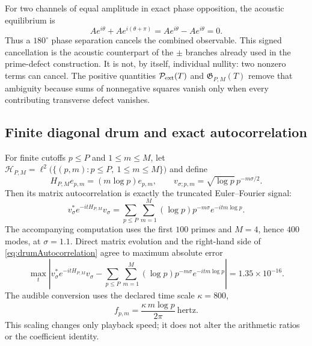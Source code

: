 \documentclass[11pt]{amsart}
\theoremstyle{definition}
\theoremstyle{remark}
\begin{document}
For two channels of equal amplitude in exact phase opposition, the acoustic equilibrium is
\begin{equation}\label{eq:antipodalAcousticCancellation}
 Ae^{i\theta}+Ae^{i(\theta+\pi)}
 =Ae^{i\theta}-Ae^{i\theta}=0.
\end{equation}
Thus a $180^\circ$ phase separation cancels the combined observable.  This signed
cancellation is the acoustic counterpart of the $\pm$ branches already used in the
prime-defect construction.  It is not, by itself, individual nullity: two nonzero terms can
cancel.  The positive quantities $\mathcal P_{\rm ext}(T)$ and
$\mathfrak G_{P,M}(T)$ remove that ambiguity because sums of nonnegative squares vanish only
when every contributing transverse defect vanishes.

\subsection{Finite diagonal drum and exact autocorrelation}
For finite cutoffs $p\le P$ and $1\le m\le M$, let
$\mathcal H_{P,M}=\ell^2\bigl(\{(p,m):p\le P,\ 1\le m\le M\}\bigr)$ and define
\begin{equation}\label{eq:finitePrimeDrum}
 H_{P,M}e_{p,m}=(m\log p)e_{p,m},
 \qquad
 v_{\sigma;p,m}=\sqrt{\log p}\,p^{-m\sigma/2}.
\end{equation}
Then its matrix autocorrelation is exactly the truncated Euler--Fourier signal:
\begin{equation}\label{eq:drumAutocorrelation}
 v_\sigma^*e^{-itH_{P,M}}v_\sigma
 =\sum_{p\le P}\sum_{m=1}^{M}(\log p)p^{-m\sigma}e^{-itm\log p}.
\end{equation}
The accompanying computation uses the first $100$ primes and $M=4$, hence $400$ modes,
at $\sigma=1.1$.  Direct matrix evolution and the right-hand side of
\eqref{eq:drumAutocorrelation} agree to maximum absolute error
\begin{equation}\label{eq:drumNumericalIdentity}
 \max_t\left|v_\sigma^*e^{-itH_{P,M}}v_\sigma
 -\sum_{p\le P}\sum_{m=1}^{M}(\log p)p^{-m\sigma}e^{-itm\log p}\right|
 =1.35\times10^{-16}.
\end{equation}
The audible conversion uses the declared time scale $\kappa=800$,
\begin{equation}\label{eq:audibleScaling}
 f_{p,m}=\frac{\kappa\,m\log p}{2\pi}\ \text{hertz}.
\end{equation}
This scaling changes only playback speed; it does not alter the arithmetic ratios or the
coefficient identity.
\end{document}
